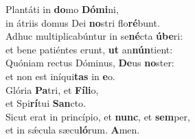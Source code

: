 \oddverse Plantáti in \textbf{do}mo \textbf{Dó}\textbf{mi}ni,~\*\\
\oddverse in átriis domus Dei \textbf{no}stri flo\textbf{ré}bunt.\\
\evenverse Adhuc multiplicabúntur in se\textbf{né}cta \textbf{ú}\textbf{be}ri:~\*\\
\evenverse et bene patiéntes erunt, \textbf{ut} an\textbf{nún}tient:\\
\oddverse Quóniam rectus Dóminus, \textbf{De}us \textbf{no}ster:~\*\\
\oddverse et non est iníqui\textbf{tas} in \textbf{e}o.\\
\evenverse Glória \textbf{Pa}tri, et \textbf{Fí}\textbf{li}o,~\*\\
\evenverse et Spi\textbf{rí}tui \textbf{San}cto.\\
\oddverse Sicut erat in princípio, et \textbf{nunc}, et \textbf{sem}per,~\*\\
\oddverse et in sǽcula sæcu\textbf{ló}rum. \textbf{A}men.\\
